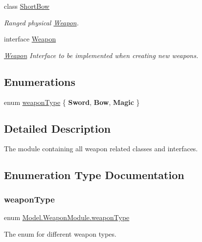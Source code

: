 \begin{DoxyCompactItemize}
class \hyperlink{class_model_1_1_weapon_module_1_1_short_bow}{Short\+Bow}
\begin{DoxyCompactList}\small\item\em Ranged physical \hyperlink{interface_model_1_1_weapon_module_1_1_weapon}{Weapon}. \end{DoxyCompactList}\item 
interface \hyperlink{interface_model_1_1_weapon_module_1_1_weapon}{Weapon}
\begin{DoxyCompactList}\small\item\em \hyperlink{interface_model_1_1_weapon_module_1_1_weapon}{Weapon} Interface to be implemented when creating new weapons. \end{DoxyCompactList}\end{DoxyCompactItemize}
\subsection*{Enumerations}
\begin{DoxyCompactItemize}
\item 
enum \hyperlink{namespace_model_1_1_weapon_module_a3390c266f89e3399c2bc7fa31f13cbec}{weapon\+Type} \{ {\bfseries Sword}, 
{\bfseries Bow}, 
{\bfseries Magic}
 \}
\end{DoxyCompactItemize}


\subsection{Detailed Description}
The module containing all weapon related classes and interfaces. 



\subsection{Enumeration Type Documentation}
\hypertarget{namespace_model_1_1_weapon_module_a3390c266f89e3399c2bc7fa31f13cbec}{}\label{namespace_model_1_1_weapon_module_a3390c266f89e3399c2bc7fa31f13cbec} 
\subsubsection{\texorpdfstring{weapon\+Type}{weaponType}}
{\footnotesize\ttfamily enum \hyperlink{namespace_model_1_1_weapon_module_a3390c266f89e3399c2bc7fa31f13cbec}{Model.\+Weapon\+Module.\+weapon\+Type}\hspace{0.3cm}{\ttfamily [strong]}}

The enum for different weapon types. 